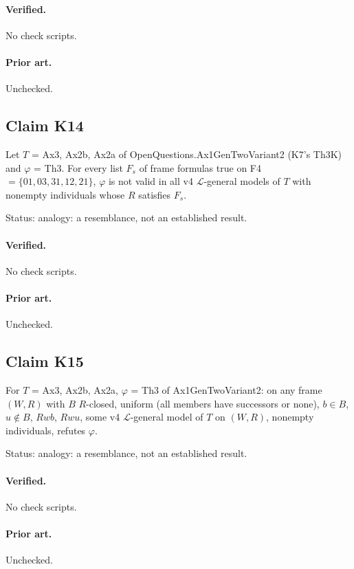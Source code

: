 \documentclass{article}
\begin{document}
\paragraph{Verified.}
No check scripts.

\paragraph{Prior art.} Unchecked.

\subsection*{Claim K14}

Let $T$ = Ax3, Ax2b, Ax2a of OpenQuestions.Ax1GenTwoVariant2 (K7's Th3K) and $\varphi$ = Th3. For every list $F_s$ of frame formulas true on F4 $=\{01,03,31,12,21\}$, $\varphi$ is not valid in all v4 $\mathcal L$-general models of $T$ with nonempty individuals whose $R$ satisfies $F_s$.

Status: analogy: a resemblance, not an established result.

\paragraph{Verified.}
No check scripts.

\paragraph{Prior art.} Unchecked.

\subsection*{Claim K15}

For $T$ = Ax3, Ax2b, Ax2a, $\varphi$ = Th3 of Ax1GenTwoVariant2: on any frame $(W,R)$ with $B$ $R$-closed, uniform (all members have successors or none), $b\in B$, $u\notin B$, $Rwb$, $Rwu$, some v4 $\mathcal L$-general model of $T$ on $(W,R)$, nonempty individuals, refutes $\varphi$.

Status: analogy: a resemblance, not an established result.

\paragraph{Verified.}
No check scripts.

\paragraph{Prior art.} Unchecked.
\end{document}
